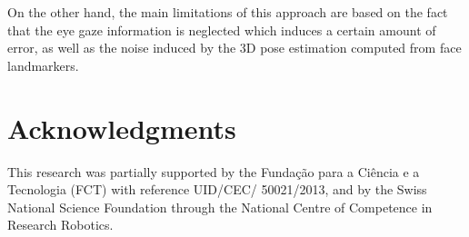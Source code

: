 \documentclass{sig-alternate}
\begin{document}
On the other hand, the main limitations of this approach are based on the fact that the eye gaze information is neglected which induces a certain amount of error, as well as the noise induced by the 3D pose estimation computed from face landmarkers.

\section*{Acknowledgments}
This research was partially supported by the Funda\c{c}\~{a}o para a Ci\^{e}ncia
e a Tecnologia (FCT) with reference UID/CEC/ 50021/2013, and by the Swiss
National Science Foundation through the National Centre of Competence in
Research Robotics.



\end{document}
